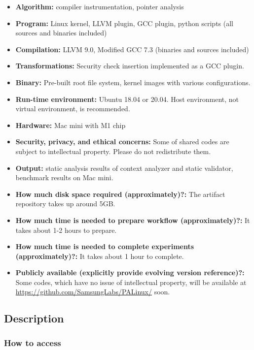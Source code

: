 \documentclass[letterpaper,twocolumn,10pt]{article}
\begin{document}
{\small
\begin{itemize}
  \item {\bf Algorithm: } compiler instrumentation, pointer analysis
  \item {\bf Program: } Linux kernel, LLVM plugin, GCC plugin, python scripts (all sources and binaries included)
  \item {\bf Compilation: } LLVM 9.0, Modified GCC 7.3 (binaries and sources included)
  \item {\bf Transformations: } Security check insertion implemented as a GCC plugin.
  \item {\bf Binary: } Pre-built root file system, kernel images with various configurations.
  \item {\bf Run-time environment: } Ubuntu 18.04 or 20.04. Host environment, not virtual environment, is recommended.
  \item {\bf Hardware: } Mac mini with M1 chip
  \item {\bf Security, privacy, and ethical concerns: } Some of shared codes are subject to intellectual property. Please do not redistribute them.
  \item {\bf Output: } static analysis results of context analyzer and static validator, benchmark results on Mac mini.
  \item {\bf How much disk space required (approximately)?: } The artifact repository takes up around 5GB.
  \item {\bf How much time is needed to prepare workflow (approximately)?: } It takes about 1-2 hours to prepare.
  \item {\bf How much time is needed to complete experiments (approximately)?: } It takes about 1 hour to complete.
  \item {\bf Publicly available (explicitly provide evolving version reference)?: } Some codes, which have no issue of intellectual property, will be available at \url{https://github.com/SamsungLabs/PALinux/} soon.
\end{itemize}

\subsection{Description}

\subsubsection{How to access}

}
\end{document}
